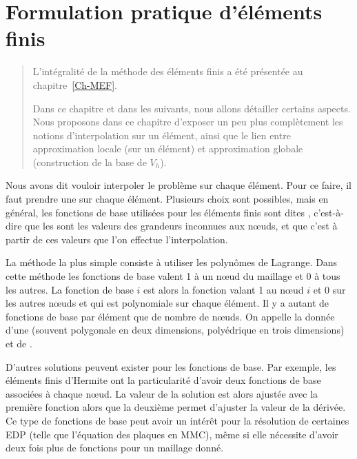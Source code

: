 \chapter{Formulation pratique d'éléments finis}\label{Ch-Elts}
\begin{abstract}
L'intégralité de la méthode des éléments finis a été présentée au chapitre~\ref{Ch-MEF}.

Dans ce chapitre et dans les suivants, nous allons détailler certains aspects.
Nous proposons dans ce chapitre d'exposer un peu plus complètement les notions
d'interpolation sur un élément, ainsi que le lien entre approximation locale
(sur un élément) et approximation globale (construction de la base de $V_h$).
\end{abstract}


Nous avons dit vouloir interpoler le problème sur chaque élément.
Pour ce faire, il faut prendre une  sur chaque élément.
Plusieurs choix sont possibles, mais en général, les fonctions de base utilisées pour les
éléments finis sont dites , c'est-à-dire que les
 sont les valeurs des grandeurs inconnues aux nœuds,
et que c'est à partir de ces valeurs que l'on effectue l'interpolation.

\medskip
La méthode la plus simple consiste à utiliser les polynômes de Lagrange.
Dans cette méthode les fonctions de base valent 1 à un nœud du maillage et 0 à tous les autres.
La fonction de base $i$ est alors la fonction valant 1 au nœud $i$ et 0 sur les autres nœuds
et qui est polynomiale sur chaque élément.
Il y a autant de fonctions de base par élément que de nombre de nœuds.
On appelle  la donnée d'une 
(souvent polygonale en deux dimensions, polyédrique en trois dimensions) et de .

\medskip
D'autres solutions peuvent exister pour les fonctions de base.
Par exemple, les éléments finis d'Hermite
ont la particularité d'avoir deux fonctions de base associées à chaque nœud.
La valeur de la solution est alors ajustée avec la première fonction alors que la deuxième
permet d'ajuster la valeur de la dérivée.
Ce type de fonctions de base peut avoir un intérêt pour la résolution de certaines EDP
(telle que l'équation des plaques en MMC), même si elle nécessite d'avoir deux fois plus
de fonctions pour un maillage donné.








